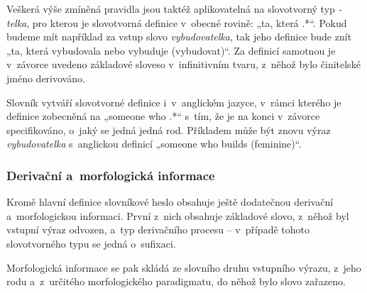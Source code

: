 Veškerá výše zmíněná pravidla jsou taktéž aplikovatelná na slovotvorný
typ \emph{-telka}, pro kterou je slovotvorná definice v~obecné rovině:
„ta, která .*``. Pokud budeme mít například za vstup slovo
\emph{vybudovatelka}, tak jeho definice bude znít „ta, která vybudovala
nebo vybuduje (vybudovat)``. Za definicí samotnou je v~závorce uvedeno
základové sloveso v~infinitivním tvaru, z~něhož bylo činitelské jméno
derivováno.

Slovník vytváří slovotvorné definice i~v~anglickém jazyce, v~rámci
kterého je definice zobecněná na „someone who .*`` s~tím, že je na konci
v~závorce specifikováno, o~jaký se jedná jedná rod. Příkladem může být
znovu výraz \emph{vybudovatelka} s~anglickou definicí „someone who
builds (feminine)``.

\hypertarget{derivaux10dnuxed-a-morfologickuxe1-informace}{%
\subsubsection{Derivační a~morfologická
informace}\label{derivaux10dnuxed-a-morfologickuxe1-informace}}

Kromě hlavní definice slovníkové heslo obsahuje ještě dodatečnou
derivační a~morfologickou informaci. První z~nich obsahuje základové
slovo, z~něhož byl vstupní výraz odvozen, a~typ derivačního procesu --
v~případě tohoto slovotvorného typu se jedná o~sufixaci.

Morfologická informace se pak skládá ze slovního druhu vstupního výrazu,
z~jeho rodu a~z~určitého morfologického paradigmatu, do něhož bylo slovo
zařazeno.
